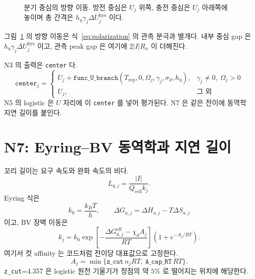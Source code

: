 \documentclass[11pt,a4paper]{article}
\newcommand{\cell}{\mathrm{cell}}
\newcommand{\eff}{\mathrm{eff}}
\newcommand{\hys}{\mathrm{hys}}
\newcommand{\rep}{\mathrm{rep}}
\begin{document}
\begin{figure}[t]
\centering
{}
\caption{분기 중심의 방향 이동. 방전 중심은 $U_j$ 위쪽, 충전 중심은 $U_j$ 아래쪽에 놓이며 총 간격은 $h_\eta\gamma_j\Delta U_j^\hys$ 이다.}
\label{fig:hysbranch}
\end{figure}

그림~\ref{fig:hysbranch} 의 방향 이동은 식~\eqref{eq:polarization} 의 관측 분극과 별개다. 내부 중심 gap 은 $h_\eta\gamma_j\Delta U_j^\hys$ 이고, 관측 peak gap 은 여기에 $2|I|R_n$ 이 더해진다.

N3 의 출력은 \texttt{center} 다.
\begin{equation}
\texttt{center}_j=
\begin{cases}
U_j+\texttt{func\_U\_branch}(T_{\rep},0,\Omega_j,\gamma_j,\sigma_d,h_\eta),&
\gamma_j\ne0,\ \Omega_j>0\\
U_j,&\text{그 외}
\end{cases}
\label{eq:centerchoice}
\end{equation}
N5 의 logistic 은 $U$ 자리에 이 \texttt{center} 를 넣어 평가된다. N7 은 같은 전이에 동역학 지연 길이를 붙인다.

\section{N7: Eyring--BV 동역학과 지연 길이}\label{sec:n7}
꼬리 길이는 요구 속도와 완화 속도의 비다.
\begin{equation}
L_{q,j}=\frac{|I|}{Q_\cell k_j}.
\label{eq:Lqbasic}
\end{equation}
Eyring 식은
\begin{equation}
k_0=\frac{k_BT}{h},\qquad
\Delta G_{a,j}=\Delta H_{a,j}-T\Delta S_{a,j}
\label{eq:eyringv7}
\end{equation}
이고, BV 장벽 이동은
\begin{equation}
k_j=k_0\exp\!\left[-\frac{\Delta G_{a,j}^{\eff}-\chi_d A_j}{RT}\right]\left(1+e^{-A_j/RT}\right).
\label{eq:kv7}
\end{equation}
여기서 컷 affinity 는 코드처럼 전이당 대표값으로 고정한다.
\begin{equation}
A_j=\min\{\texttt{z\_cut}\,n_jRT,\ \texttt{A\_cap\_RT}\,RT\}.
\label{eq:Acut}
\end{equation}
\texttt{z\_cut}=4.357 은 logistic 원천 기울기가 정점의 약 $5\%$ 로 떨어지는 위치에 해당한다.
\end{document}
